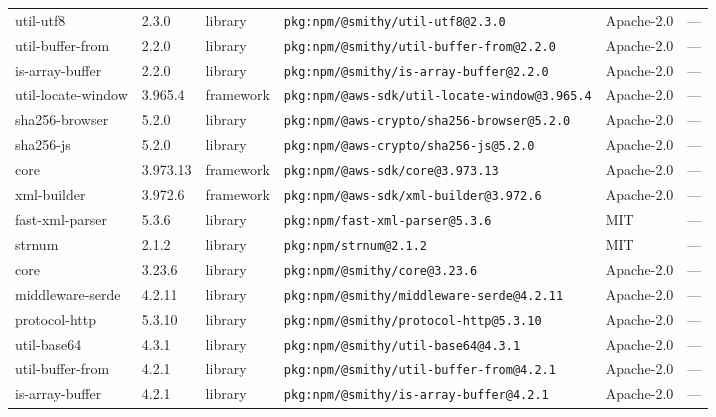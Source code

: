 \documentclass[11pt,a4paper]{article}
\begin{document}
\begin{longtable}{|p{4cm}|p{2cm}|p{1.6cm}|p{5cm}|p{1.5cm}|p{3.5cm}|}
\raggedright util-utf8 & 2.3.0 & library & \small\texttt{pkg:npm/@smithy/util-utf8@2.3.0} & Apache-2.0 & \small — \\
\raggedright util-buffer-from & 2.2.0 & library & \small\texttt{pkg:npm/@smithy/util-buffer-from@2.2.0} & Apache-2.0 & \small — \\
\raggedright is-array-buffer & 2.2.0 & library & \small\texttt{pkg:npm/@smithy/is-array-buffer@2.2.0} & Apache-2.0 & \small — \\
\raggedright util-locate-window & 3.965.4 & framework & \small\texttt{pkg:npm/@aws-sdk/util-locate-window@3.965.4} & Apache-2.0 & \small — \\
\raggedright sha256-browser & 5.2.0 & library & \small\texttt{pkg:npm/@aws-crypto/sha256-browser@5.2.0} & Apache-2.0 & \small — \\
\raggedright sha256-js & 5.2.0 & library & \small\texttt{pkg:npm/@aws-crypto/sha256-js@5.2.0} & Apache-2.0 & \small — \\
\raggedright core & 3.973.13 & framework & \small\texttt{pkg:npm/@aws-sdk/core@3.973.13} & Apache-2.0 & \small — \\
\raggedright xml-builder & 3.972.6 & framework & \small\texttt{pkg:npm/@aws-sdk/xml-builder@3.972.6} & Apache-2.0 & \small — \\
\raggedright fast-xml-parser & 5.3.6 & library & \small\texttt{pkg:npm/fast-xml-parser@5.3.6} & MIT & \small — \\
\raggedright strnum & 2.1.2 & library & \small\texttt{pkg:npm/strnum@2.1.2} & MIT & \small — \\
\raggedright core & 3.23.6 & library & \small\texttt{pkg:npm/@smithy/core@3.23.6} & Apache-2.0 & \small — \\
\raggedright middleware-serde & 4.2.11 & library & \small\texttt{pkg:npm/@smithy/middleware-serde@4.2.11} & Apache-2.0 & \small — \\
\raggedright protocol-http & 5.3.10 & library & \small\texttt{pkg:npm/@smithy/protocol-http@5.3.10} & Apache-2.0 & \small — \\
\raggedright util-base64 & 4.3.1 & library & \small\texttt{pkg:npm/@smithy/util-base64@4.3.1} & Apache-2.0 & \small — \\
\raggedright util-buffer-from & 4.2.1 & library & \small\texttt{pkg:npm/@smithy/util-buffer-from@4.2.1} & Apache-2.0 & \small — \\
\raggedright is-array-buffer & 4.2.1 & library & \small\texttt{pkg:npm/@smithy/is-array-buffer@4.2.1} & Apache-2.0 & \small — \\

\end{longtable}
\end{document}

